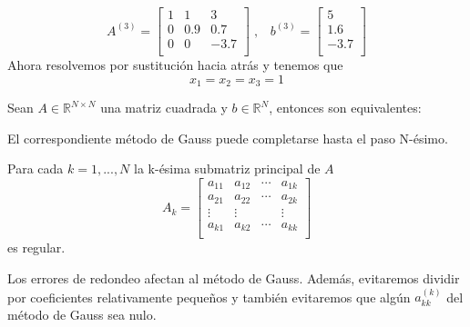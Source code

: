 \begin{nlist}
\begin{ejemplo}
	\[ A^{(3)} =
	\begin{bmatrix}
	1 & 1 & 3 \\
	0 & 0.9 & 0.7 \\
	0 & 0 & -3.7 \\ 
	\end{bmatrix} \; ,
	\; \; \;
	b^{(3)} =
	\begin{bmatrix}
	5 \\
	1.6 \\
	-3.7 \\
	\end{bmatrix} \] %
	Ahora resolvemos por sustitución hacia atrás y tenemos que
	\[ x_1 = x_2 = x_3 = 1 \]
	\end{ejemplo}
			
	\begin{nprop}
	Sean $A \in \mathbb{R}^{N \times N}$ una matriz cuadrada y $b \in \mathbb{R}^N$, entonces son equivalentes:
		\begin{nlist}
		\item El correspondiente método de Gauss puede completarse hasta el paso N-ésimo.
		\item Para cada $k = 1,..., N$ la k-ésima submatriz principal de $A$
		\[ A_k =
		\begin{bmatrix}
		a_{11} & a_{12} & \cdots & a_{1k} \\
		a_{21} & a_{22} & \cdots & a_{2k} \\
		\vdots & \vdots & & \vdots \\
		a_{k1} & a_{k2} & \cdots & a_{kk} \\
		\end{bmatrix} \]
		es regular.
		\end{nlist}
	\end{nprop}
			
Los errores de redondeo afectan al método de Gauss. Además, evitaremos dividir por coeficientes relativamente pequeños y también evitaremos que algún $a_{kk}^{(k)}$ del método de Gauss sea nulo.


\end{nlist}
